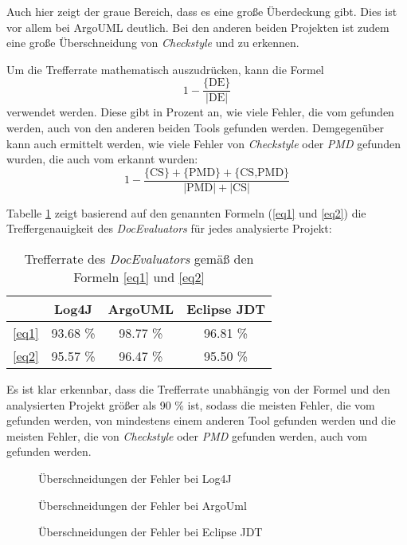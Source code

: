 Auch hier zeigt der graue Bereich, dass es eine große Überdeckung gibt. Dies ist vor allem bei ArgoUML deutlich. Bei den anderen beiden Projekten ist zudem eine große Überschneidung von \textit{Checkstyle} und \doceval zu erkennen.

Um die Trefferrate mathematisch auszudrücken, kann die Formel
\begin{equation}\label{eq1}
    1-\frac{\text{\{DE\}}}{|\text{DE}|}
\end{equation} verwendet werden. Diese gibt in Prozent an, wie viele Fehler, die vom \doceval gefunden werden, auch von den anderen beiden Tools gefunden werden. Demgegenüber kann auch ermittelt werden, wie viele Fehler von \textit{Checkstyle} oder \textit{PMD} gefunden wurden, die auch vom \doceval erkannt wurden:
\begin{equation}\label{eq2}
    1-\frac{\text{\{CS\}}+\text{\{PMD\}}+\text{\{CS,PMD\}}}{|\text{PMD}|+|\text{CS}|}
\end{equation}

Tabelle \ref{tab:hit_rate} zeigt basierend auf den genannten Formeln (\ref{eq1} und \ref{eq2}) die Treffergenauigkeit des \textit{DocEvaluators} für jedes analysierte Projekt:
\begin{table}[]
    \centering
    \begin{tabular}{c|c|c|c}
     & Log4J & ArgoUML & Eclipse JDT \\ \hline
    \ref{eq1} &   93.68 \% &	98.77 \% &	96.81 \% \\\hline
     \ref{eq2} & 95.57 \% &	96.47 \% &	95.50 \% \\\hline

    \end{tabular}
    \caption{Trefferrate des \textit{DocEvaluators} gemäß den Formeln \ref{eq1} und \ref{eq2}}
    \label{tab:hit_rate}
\end{table}
Es ist klar erkennbar, dass die Trefferrate unabhängig von der Formel und den analysierten Projekt größer als 90 \% ist, sodass die meisten Fehler, die vom \doceval gefunden werden, von mindestens einem anderen Tool gefunden werden und die meisten Fehler, die von \textit{Checkstyle} oder \textit{PMD} gefunden werden, auch vom \doceval gefunden werden.
\begin{figure}
    \centering

    \caption{Überschneidungen der Fehler bei Log4J}
    \label{fig:log4j_venn}
\end{figure}

\begin{figure}
    \centering

    \caption{Überschneidungen der Fehler bei ArgoUml}
    \label{fig:argo_venn}
\end{figure}
\begin{figure}
    \centering

    \caption{Überschneidungen der Fehler bei Eclipse JDT}
    \label{fig:eclipse_venn}
\end{figure}
\clearpage
